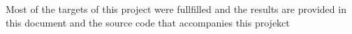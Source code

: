 
 Most of the targets of this project were fullfilled and the results are provided in this document and the source code that accompanies this projekct
